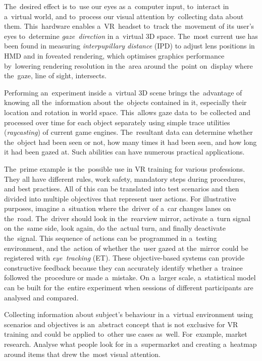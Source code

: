 \documentclass[english,bachelor,unicode]{ctufit-thesis}
\theoremstyle{plain}
\theoremstyle{definition}
\theoremstyle{remark}
\numberwithin{theorem}{chapter}
\begin{document}
The~desired effect is to~use our eyes as a~computer input, to~interact in a~virtual world, and to~process our visual attention by~collecting data about them. This~hardware enables a~VR~headset to~track the~movement of its user's eyes to~determine \emph{gaze~direction} in a~virtual 3D space. The~most current use has been found in measuring \emph{interpupillary distance} (IPD) to adjust lens positions in HMD and in foveated rendering, which optimises graphics performance by~lowering rendering resolution in the~area around the~point on~display where the~gaze, line of sight, intersects.

Performing an~experiment inside a~virtual 3D scene brings the~advantage of knowing all the~information about the~objects contained in it, especially their location and rotation in world space. This~allows gaze data to~be collected and processed over time for each object separately using simple trace utilities (\emph{raycasting}) of current game engines. The~resultant data can determine whether the~object had been seen or not, how many times it had been seen, and how long it had been gazed at. Such abilities can have numerous practical applications.

The~prime example is the~possible use in VR training for various professions. They all have different rules, work safety, mandatory steps during procedures, and best practises. All of this can be translated into test scenarios and then divided into multiple objectives that represent user actions. For illustrative purposes, imagine a~situation where the~driver of a~car changes lanes on the~road. The~driver should look in the~rearview mirror, activate a~turn signal on the~same side, look again, do the~actual turn, and finally deactivate the~signal. This sequence of actions can be programmed in a~testing environment, and the~action of whether the~user gazed at the~mirror could be registered with \emph{eye~tracking} (ET). These objective-based systems can provide constructive feedback because they can accurately identify whether a~trainee followed the~procedure or made a~mistake. On a~larger scale, a~statistical model can be built for the~entire experiment when sessions of different participants are analysed and compared.

\pagebreak{}
Collecting information about subject's behaviour in a~virtual environment using scenarios and objectives is an~abstract concept that is not exclusive for VR training and could be applied to~other use cases as~well. For~example, market research. Analyse what people look for in a~supermarket and creating a~heatmap around items that drew the~most visual attention.
\end{document}
